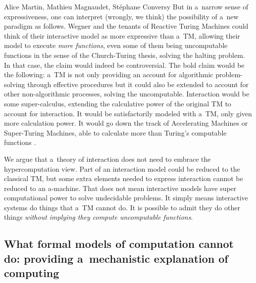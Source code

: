 \begin{artengenv2auth}{Alice Martin, Mathieu Magnaudet, Stéphane Conversy}
But in a~narrow sense of expressiveness, one can interpret (wrongly, we think) the possibility of a~new paradigm as follows. Wegner and the tenants of Reactive Turing Machines could think of their interactive model as more expressive than a~TM, allowing their model to execute \textit{more functions}, even some of them being uncomputable functions in the sense of the Church-Turing thesis, solving the halting problem. In that case, the claim would indeed be controversial. The bold claim would be the following: a~TM is not only providing an account for algorithmic problem-solving through effective procedures but it could also be extended to account for other non-algorithmic processes, solving the uncomputable. Interaction would be some super-calculus, extending the calculative power of the original TM to account for interaction. It would be satisfactorily modeled with a~TM, only given more calculation power. It would go down the track of Accelerating Machines or Super-Turing Machines, able to calculate more than Turing's computable functions \parencite{Copeland2002, Copeland2011, MacLennan2009}. 

We argue that a~theory of interaction does not need to embrace the hypercomputation view. Part of an interaction model could be reduced to the classical TM, but some extra elements needed to express interaction cannot be reduced to an a-machine. That does not mean interactive models have super computational power to solve undecidable problems. It simply means interactive systems do things that a~TM cannot do. It is possible to admit they do other things \textit{without implying they compute uncomputable functions}. 


\subsection{What formal models of computation cannot do: providing a~mechanistic explanation of computing}


\end{artengenv2auth}
